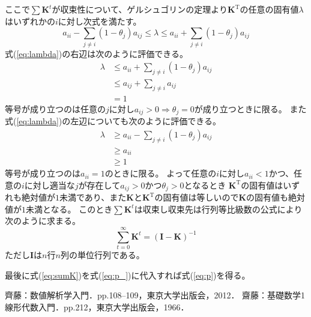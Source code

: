 \documentclass{jarticle}
\numberwithin{equation}{section}
\numberwithin{table}{section}
\numberwithin{figure}{section}
\theoremstyle{plain}
\begin{document}
ここで$ \sum \bm{K}^t $が収束性について、ゲルシュゴリンの定理\cite{bib:s_saito}より$ \bm{K}^\mathrm{T} $の任意の固有値$ \lambda $はいずれかの$ i $に対し次式を満たす。
\begin{equation}
    \label{eq:lambda}
    a_{i i} - \sum_{j \ne i}(1 - \theta_j) a_{i j} \le \lambda \le a_{i i} + \sum_{j \ne i}(1 - \theta_j) a_{i j}
\end{equation}
式(\ref{eq:lambda})の右辺は次のように評価できる。
\begin{align*}
    \lambda &\le a_{i i} + \sum_{j \ne i}(1 - \theta_j) a_{i j} \\
    &\le a_{i j} + \sum_{j \ne i} a_{i j} \\
    &= 1
\end{align*}
等号が成り立つのは任意の$j$に対し$a_{i j} > 0 \Rightarrow \theta_j = 0$が成り立つときに限る。
また式(\ref{eq:lambda})の左辺についても次のように評価できる。
\begin{align*}
    \lambda &\ge a_{i i} - \sum_{j \ne i}(1 - \theta_j) a_{i j} \\
    &\ge a_{i i} \\
    &\ge 1
\end{align*}
等号が成り立つのは$a_{i i}=1$のときに限る。
よって任意の$i$に対し$a_{i i} < 1$かつ、任意の$i$に対し適当な$j$が存在して$a_{i j} > 0$かつ$\theta_j > 0$となるとき
$ \bm{K}^\mathrm{T} $の固有値はいずれも絶対値が$ 1 $未満であり、また$ \bm{K} $と$ \bm{K}^\mathrm{T} $の固有値は等しいので$ \bm{K} $の固有値も絶対値が$ 1 $未満となる。
このとき$ \sum \bm{K}^t $は収束し収束先は行列等比級数の公式\cite{bib:m_saito}により次のように求まる。
\begin{equation} \label{eq:sumK}
    \sum_{t=0}^{\infty} \bm{K}^t = (\bm{I} - \bm{K})^{-1}
\end{equation}
ただし$ \bm{I} $は$n$行$n$列の単位行列である。

最後に式(\ref{eq:sumK})を式(\ref{eq:p_})に代入すれば式(\ref{eq:p})を得る。

\begin{thebibliography}{99}
    齊藤：数値解析学入門．pp.108--109，東京大学出版会，2012．
    齋藤：基礎数学1　線形代数入門．pp.212，東京大学出版会，1966．
\end{thebibliography}
\end{document}
